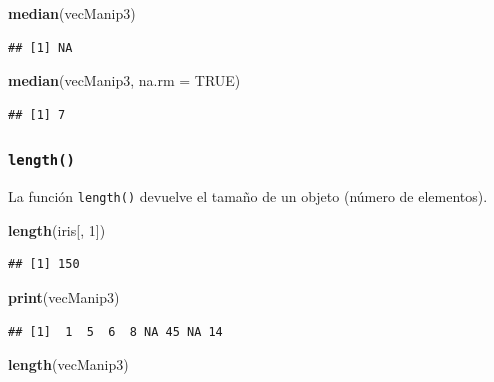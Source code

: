 \documentclass[
]{book}
\newenvironment{Shaded}{\begin{snugshade}}{\end{snugshade}}
\newcommand{\DataTypeTok}[1]{\textcolor[rgb]{0.13,0.29,0.53}{#1}}
\newcommand{\DecValTok}[1]{\textcolor[rgb]{0.00,0.00,0.81}{#1}}
\newcommand{\KeywordTok}[1]{\textcolor[rgb]{0.13,0.29,0.53}{\textbf{#1}}}
\newcommand{\NormalTok}[1]{#1}
\newcommand{\OtherTok}[1]{\textcolor[rgb]{0.56,0.35,0.01}{#1}}
\begin{document}
\begin{Shaded}
\begin{Highlighting}[]
\KeywordTok{median}\NormalTok{(vecManip3)}
\end{Highlighting}
\end{Shaded}

\begin{verbatim}
## [1] NA
\end{verbatim}

\begin{Shaded}
\begin{Highlighting}[]
\KeywordTok{median}\NormalTok{(vecManip3, }\DataTypeTok{na.rm =} \OtherTok{TRUE}\NormalTok{)}
\end{Highlighting}
\end{Shaded}

\begin{verbatim}
## [1] 7
\end{verbatim}

\hypertarget{l015length}{%
\subsubsection{\texorpdfstring{\texttt{length()}}{length()}}\label{l015length}}

La función \texttt{length()} devuelve el tamaño de un objeto (número de elementos).

\begin{Shaded}
\begin{Highlighting}[]
\KeywordTok{length}\NormalTok{(iris[, }\DecValTok{1}\NormalTok{])}
\end{Highlighting}
\end{Shaded}

\begin{verbatim}
## [1] 150
\end{verbatim}

\begin{Shaded}
\begin{Highlighting}[]
\KeywordTok{print}\NormalTok{(vecManip3)}
\end{Highlighting}
\end{Shaded}

\begin{verbatim}
## [1]  1  5  6  8 NA 45 NA 14
\end{verbatim}

\begin{Shaded}
\begin{Highlighting}[]
\KeywordTok{length}\NormalTok{(vecManip3)}
\end{Highlighting}
\end{Shaded}
\end{document}
